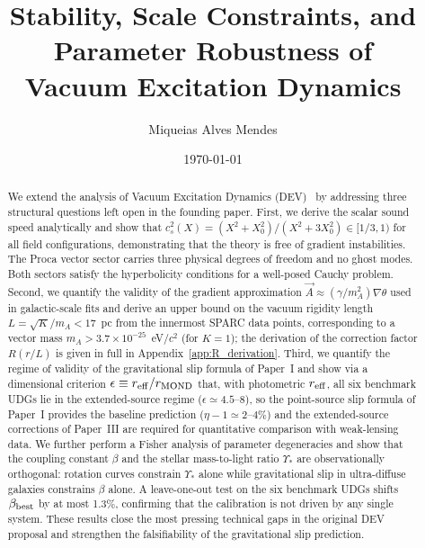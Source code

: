 \documentclass[aps,prd,reprint,floatfix,nofootinbib,superscriptaddress]{revtex4-2}
\newcommand{\Xzero}{X_0}
\newcommand{\cs}{c_s}
\begin{document}
\title{Stability, Scale Constraints, and Parameter Robustness of\\
       Vacuum Excitation Dynamics}

\author{Miqueias Alves Mendes}

\date{\today}

\begin{abstract}
We extend the analysis of Vacuum Excitation Dynamics (DEV)~\cite{Mendes2026}
by addressing three structural questions left open in the founding paper.
First, we derive the scalar sound speed analytically and show that
$\cs^2(X) = (X^2 + \Xzero^2)/(X^2 + 3\Xzero^2) \in [1/3,1)$ for all
field configurations, demonstrating that the theory is free of
gradient instabilities. The Proca vector sector carries three physical
degrees of freedom and no ghost modes. Both sectors satisfy the
hyperbolicity conditions for a well-posed Cauchy problem.
Second, we quantify the validity of the gradient approximation
$\vec{A}\approx(\gamma/m_A^2)\nabla\theta$ used in galactic-scale fits
and derive an upper bound on the vacuum rigidity length
$L = \sqrt{K}/m_A < 17$~pc from the innermost SPARC data points,
corresponding to a vector mass $m_A > 3.7\times10^{-25}$~eV/$c^2$
(for $K=1$); the derivation of the correction factor $R(r/L)$ is
given in full in Appendix~\ref{app:R_derivation}.
Third, we quantify the regime of validity of the gravitational slip
formula of Paper~I and show via a dimensional criterion
$\epsilon \equiv r_{\rm eff}/r_{\rm MOND}$ that, with photometric
$r_{\rm eff}$, all six benchmark UDGs lie in the extended-source
regime ($\epsilon \simeq 4.5$--$8$), so the point-source slip
formula of Paper~I provides the baseline prediction
($\eta-1 \simeq 2$--$4\%$) and the extended-source corrections of
Paper~III are required for quantitative comparison with weak-lensing
data. We further perform a Fisher analysis of
parameter degeneracies and show that the coupling constant $\beta$
and the stellar mass-to-light ratio $\Upsilon_*$ are observationally
orthogonal: rotation curves constrain $\Upsilon_*$ alone while
gravitational slip in ultra-diffuse galaxies constrains $\beta$ alone.
A leave-one-out test on the six benchmark UDGs shifts $\beta_{\rm best}$
by at most 1.3\%, confirming that the calibration is not driven by
any single system. These results close the most pressing technical
gaps in the original DEV proposal and strengthen the falsifiability
of the gravitational slip prediction.
\end{abstract}
\end{document}

